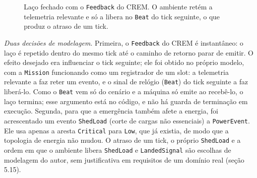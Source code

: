 \documentclass[12pt,a4paper]{article}
\begin{document}
\begin{figure}[h]
\centering
\footnotesize
{}
\caption{Laço fechado com o \texttt{Feedback} do CREM. O ambiente retém a telemetria relevante e só a libera no \texttt{Beat} do tick seguinte, o que produz o atraso de um tick.}
\label{fig:laco}
\end{figure}

\textit{Duas decisões de modelagem.} Primeira, o \texttt{Feedback} do CREM é instantâneo: o laço é repetido dentro do mesmo tick até o caminho de retorno parar de emitir. O efeito desejado era influenciar o tick seguinte; ele foi obtido no próprio modelo, com a \texttt{Mission} funcionando como um registrador de um slot: a telemetria relevante a faz reter um evento, e o sinal de relógio (\texttt{Beat}) do tick seguinte a faz liberá-lo. Como o \texttt{Beat} vem só do cenário e a máquina só emite ao recebê-lo, o laço termina; esse argumento está no código, e não há guarda de terminação em execução. Segunda, para que a emergência também afete a energia, foi acrescentado um evento \texttt{ShedLoad} (corte de cargas não essenciais) a \texttt{PowerEvent}. Ele usa apenas a aresta \texttt{Critical} para \texttt{Low}, que já existia, de modo que a topologia de energia não mudou. O atraso de um tick, o próprio \texttt{ShedLoad} e a ordem em que o ambiente libera \texttt{ShedLoad} e \texttt{LandedSignal} são escolhas de modelagem do autor, sem justificativa em requisitos de um domínio real (seção 5.15).
\end{document}
